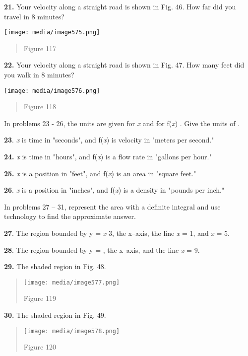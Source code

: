 \textbf{21.} Your velocity along a straight road is shown in Fig. 46.
How far did you travel in 8 minutes?

\texttt{[image: media/image575.png]}

\begin{quote}
Figure 117
\end{quote}

\textbf{22.} Your velocity along a straight road is shown in Fig. 47.
How many feet did you walk in 8 minutes?

\texttt{[image: media/image576.png]}

\begin{quote}
Figure 118
\end{quote}

In problems 23 - 26, the units are given for \emph{x} and for
f(\emph{x}) . Give the units of .

\textbf{23}. \emph{x} is time in "seconds", and f(\emph{x}) is velocity
in "meters per second."

\textbf{24.} \emph{x} is time in "hours", and f(\emph{x}) is a flow rate
in "gallons per hour."

\textbf{25.} \emph{x} is a position in "feet", and f(\emph{x}) is an
area in "square feet."

\textbf{26}. \emph{x} is a position in "inches", and f(\emph{x}) is a
density in "pounds per inch."

In problems 27 -- 31, represent the area with a definite integral and
use technology to find the approximate answer.

\textbf{27}. The region bounded by y = \emph{x} 3, the x--axis, the line
\emph{x} = 1, and \emph{x} = 5.

\textbf{28}. The region bounded by y = , the x--axis, and the line
\emph{x} = 9.

\textbf{29.} The shaded region in Fig. 48.

\begin{quote}
\texttt{[image: media/image577.png]}

Figure 119
\end{quote}

\textbf{30.} The shaded region in Fig. 49.

\begin{quote}
\texttt{[image: media/image578.png]}

Figure 120
\end{quote}

